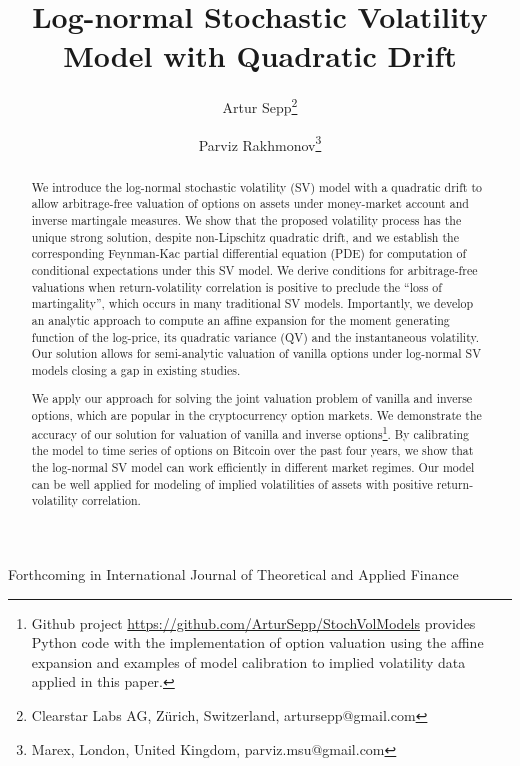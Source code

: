 \documentclass[pdftex,11pt,a4paper] {article}
\date{\displaydate{date}}
\begin{document}
\title{Log-normal Stochastic Volatility Model with Quadratic Drift}

\author{Artur Sepp\thanks{Clearstar Labs AG, Z\"{u}rich, Switzerland, artursepp@gmail.com} \and Parviz Rakhmonov\thanks{Marex, London, United Kingdom, parviz.msu@gmail.com}}


\maketitle

\begin{center}
Forthcoming in International Journal of Theoretical and Applied Finance
\end{center}


\begin{abstract}
We introduce the log-normal stochastic volatility (SV) model with a quadratic drift to allow arbitrage-free valuation of options on assets under money-market account and inverse martingale measures. We show that the proposed volatility process has the unique strong solution, despite non-Lipschitz quadratic drift, and we establish the corresponding Feynman-Kac partial differential equation (PDE) for computation of conditional expectations under this SV model. We derive conditions for arbitrage-free valuations when return-volatility correlation is positive to preclude the ``loss of martingality'', which occurs in many traditional SV models. Importantly, we develop an analytic approach to compute an affine expansion for the moment generating function of the log-price, its quadratic variance (QV) and the instantaneous volatility. Our solution allows for semi-analytic valuation of vanilla options under log-normal SV models closing a gap in existing studies.

We apply our approach for solving the joint valuation problem of vanilla and inverse options, which are popular in the cryptocurrency option markets. We demonstrate the accuracy of our solution for valuation of vanilla and inverse options\footnote{Github project \url{https://github.com/ArturSepp/StochVolModels} provides Python code with the implementation of option valuation using the affine expansion and examples of model calibration to implied volatility data applied in this paper.}. By calibrating the model to time series of options on Bitcoin over the past four years, we show that the log-normal SV model can work efficiently in different market regimes. Our model can be well applied for modeling of implied volatilities of assets with positive return-volatility correlation.
\end{abstract}
\end{document}
